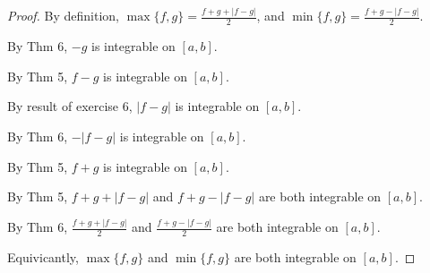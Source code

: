 \documentclass{article} %
\theoremstyle{plain}
\theoremstyle{definition}
\begin{document}
\begin{proof}
    By definition, $\max\{f, g\} = \frac{f+g+|f-g|}{2}$, and $\min\{f, g\} = \frac{f+g-|f-g|}{2}$.

    By Thm 6, $-g$ is integrable on $[a,b]$.

    By Thm 5, $f-g$ is integrable on $[a,b]$.

    By result of exercise 6, $|f-g|$ is integrable on $[a,b]$.

    By Thm 6, $-|f-g|$ is integrable on $[a,b]$.

    By Thm 5, $f+g$ is integrable on $[a,b]$.

    By Thm 5, $f+g+|f-g|$ and $f+g-|f-g|$ are both integrable on $[a,b]$.

    By Thm 6, $\frac{f+g+|f-g|}{2}$ and $\frac{f+g-|f-g|}{2}$ are both integrable on $[a,b]$.

    Equivicantly, $\max\{f, g\}$ and $\min\{f, g\}$ are both integrable on $[a,b]$.
\end{proof}
    
    
\end{document}
